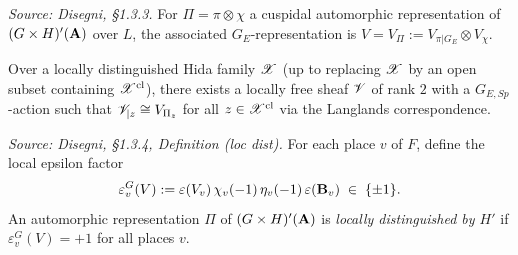\begin{definition}
  \label{def:GaloisRepresentation}
  \textit{Source: Disegni, §1.3.3.}
  For $\Pi = \pi \otimes \chi$ a cuspidal automorphic representation of
  $(G \times H)'(\mathbf{A})$ over $L$, the associated $G_E$-representation is
  $V = V_\Pi := V_{\pi|G_E} \otimes V_\chi$.

  Over a locally distinguished Hida family $\mathscr{X}$
  (up to replacing $\mathscr{X}$ by an open subset containing $\mathscr{X}^{\mathrm{cl}}$),
  there exists a locally free sheaf $\mathscr{V}$ of rank $2$ with a
  $G_{E,Sp}$-action such that $\mathscr{V}_{|z} \cong V_{\Pi_z}$ for all
  $z \in \mathscr{X}^{\mathrm{cl}}$ via the Langlands correspondence.
\end{definition}

\begin{definition}
  \label{def:LocallyDistinguished}
  \textit{Source: Disegni, §1.3.4, Definition (loc dist).}
  For each place $v$ of $F$, define the local epsilon factor
  \[
    \varepsilon_v^G(V) := \varepsilon(V_v)\,\chi_v(-1)\,\eta_v(-1)\,
    \varepsilon(\mathbf{B}_v) \;\in\; \{\pm 1\}.
  \]
  An automorphic representation $\Pi$ of $(G \times H)'(\mathbf{A})$ is
  \emph{locally distinguished by $H'$} if $\varepsilon_v^G(V) = +1$
  for all places $v$.
\end{definition}

